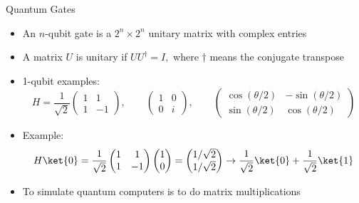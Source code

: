 \documentclass[xcolor=dvipsnames]{beamer}
\begin{document}
\begin{frame}{Quantum Gates}
  \begin{itemize}
    \item An $n$-qubit gate is a $2^n\times 2^n$ unitary matrix with complex entries
    \item A matrix $U$ is unitary if $UU^\dagger=I,$ where $\dagger$ means the conjugate transpose
    \item 1-qubit examples:
    $$H=\frac{1}{\sqrt{2}}
    \begin{pmatrix}
      1 & 1\\
      1 & -1
    \end{pmatrix},\qquad
    \begin{pmatrix}
      1 & 0\\
      0 & i
    \end{pmatrix},\qquad 
    \begin{pmatrix}
      \cos(\theta/2) & -\sin(\theta/2)\\
      \sin(\theta/2) & \cos(\theta/2)
    \end{pmatrix}
    $$
    \item Example:
    $$H\ket{0}=\frac{1}{\sqrt{2}}
    \begin{pmatrix}
      1 & 1\\
      1 & -1
    \end{pmatrix}
    \begin{pmatrix}
      1\\
      0
    \end{pmatrix}=
    \begin{pmatrix}
      1/\sqrt{2}\\
      1/\sqrt{2}
    \end{pmatrix}\to\frac{1}{\sqrt{2}}\ket{0}+\frac{1}{\sqrt{2}}\ket{1}$$
    \item To simulate quantum computers is to do matrix multiplications
  \end{itemize}
\end{frame}
\end{document}
